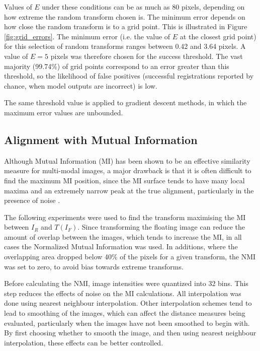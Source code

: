 \documentclass{report}
\begin{document}
Values of $E$ under these conditions can be as much as 80 pixels, depending on how extreme the random transform chosen is. The minimum error depends on how close the random transform is to a grid point. This is illustrated in Figure \ref{fig:grid_errors}. The minimum error (i.e. the value of $E$ at the closest grid point) for this selection of random transforms ranges between 0.42 and 3.64 pixels. A value of $E=5$ pixels was therefore chosen for the success threshold. The vast majority (99.74\%) of grid points correspond to an error greater than this threshold, so the likelihood of false positives (successful registrations reported by chance, when model outputs are incorrect) is low.

The same threshold value is applied to gradient descent methods, in which the maximum error values are unbounded.


\subsection{Alignment with Mutual Information}
\label{sec:mi_results}
Although Mutual Information (MI) has been shown to be an effective similarity measure for multi-modal images,
a major drawback is that it is often difficult to find the maximum MI position, since the MI surface tends to have many local maxima and an extremely narrow peak at the true alignment, particularly in the presence of noise \citep{maes1997multimodality}. 

The following experiments were used to find the transform maximising the MI between $I_R$ and $T(I_F)$. Since transforming the floating image can reduce the amount of overlap between the images, which tends to increase the MI, in all cases the Normalized Mutual Information was used. In additions, where the overlapping area dropped below 40\% of the pixels for a given transform, the NMI was set to zero, to avoid bias towards extreme transforms.

Before calculating the NMI, image intensities were quantized into 32 bins. This step reduces the effects of noise on the MI calculations. All interpolation was done using nearest neighbour interpolation. Other interpolation schemes tend to lead to smoothing of the images, which can affect the distance measures being evaluated, particularly when the images have not been smoothed to begin with. By first choosing whether to smooth the image, and then using nearest neighbour interpolation, these effects can be better controlled.
\end{document}
